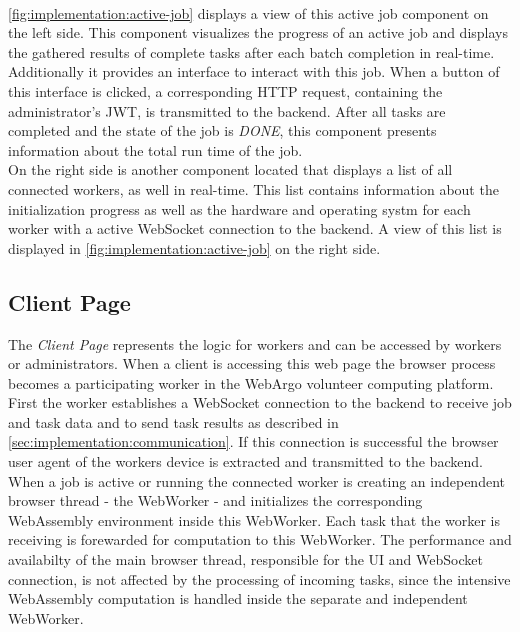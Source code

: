 ~\\
\autoref{fig:implementation:active-job} displays a view of this active job component on the left side. This component visualizes the progress of an active job and displays the gathered results of complete tasks after each batch completion in real-time. Additionally it provides an interface to interact with this job. When a button of this interface is clicked, a corresponding \acs{HTTP} request, containing the administrator's \ac{JWT}, is transmitted to the backend. After all tasks are completed and the state of the job is \emph{DONE}, this component presents information about the total run time of the job. 
~\\
On the right side is another component located that displays a list of all connected workers, as well in real-time. This list contains information about the initialization progress as well as the hardware and operating systm for each worker with a active WebSocket connection to the backend. A view of this list is displayed in \autoref{fig:implementation:active-job} on the right side.

\subsection{Client Page}
\label{subsec:implementation:client-page}
The \emph{Client Page} represents the logic for workers and can be accessed by workers or administrators. When a client is accessing this web page the browser process becomes a participating worker in the WebArgo volunteer computing platform. First the worker establishes a WebSocket connection to the backend to receive job and task data and to send task results as described in \autoref{sec:implementation:communication}. If this connection is successful the browser user agent of the workers device is extracted and transmitted to the backend. When a job is active or running the connected worker is creating an independent browser thread - the WebWorker - and initializes the corresponding WebAssembly environment inside this WebWorker. Each task that the worker is receiving is forewarded for computation to this WebWorker. The performance and availabilty of the main browser thread, responsible for the \ac{UI} and WebSocket connection, is not affected by the processing of incoming tasks, since the intensive WebAssembly computation is handled inside the separate and independent WebWorker.

